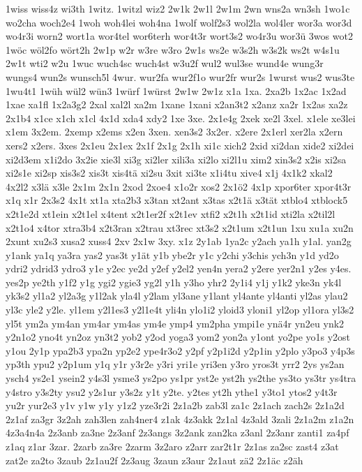 {1wiss
wiss4z
wi3th
1witz.
1witzl
wiz2
2w1k
2w1l
2w1m
2wn
wns2a
wn3sh
1wo1c
wo2cha
woch2e4
1woh
woh4lei
woh4na
1wolf
wolf2s3
wol2la
wol4ler
wor3a
wor3d
wo4r3i
worn2
wort1a
wor4tel
wor6terh
wor4t3r
wort3s2
wo4r3u
wor3ü
3wos
wot2
1wöc
wöl2fo
wört2h
2w1p
w2r
w3re
w3ro
2w1s
ws2e
w3s2h
w3s2k
ws2t
w4s1u
2w1t
wti2
w2u
1wuc
wuch4sc
wuch4st
w3u2f
wul2
wul3se
wund4e
wung3r
wungs4
wun2s
wunsch5l
4wur.
wur2fa
wur2f1o
wur2fr
wur2s
1wurst
wus2
wus3te
1wu4t1
1wüh
wül2
wün3
1würf
1würst
2w1w
2w1z
x1a
1xa.
2xa2b
1x2ac
1x2ad
1xae
xa1fl
1x2a3g2
2xal
xal2l
xa2m
1xane
1xani
x2an3t2
x2anz
xa2r
1x2as
xa2z
2x1b4
x1ce
x1ch
x1cl
4x1d
xda4
xdy2
1xe
3xe.
2x1e4g
2xek
xe2l
3xel.
x1ele
xe3lei
x1em
3x2em.
2xemp
x2ems
x2en
3xen.
xen3s2
3x2er.
x2ere
2x1erl
xer2la
x2ern
xers2
x2ers.
3xes
2x1eu
2x1ex
2x1f
2x1g
2x1h
xi1c
xich2
2xid
xi2dan
xide2
xi2dei
xi2d3em
x1i2do
3x2ie
xie3l
xi3g
xi2ler
xili3a
xi2lo
xi2l1u
xim2
xin3s2
x2is
xi2sa
xi2s1e
xi2sp
xis3s2
xis3t
xis4tä
xi2su
3xit
xi3te
x1i4tu
xive4
x1j
4x1k2
xkal2
4x2l2
x3lä
x3le
2x1m
2x1n
2xod
2xoe4
x1o2r
xos2
2x1ö2
4x1p
xpor6ter
xpor4t3r
x1q
x1r
2x3s2
4x1t
xt1a
xta2b3
x3tan
xt2ant
x3tas
x2t1ä
x3tät
xtblo4
xtblock5
x2t1e2d
xt1ein
x2t1el
x4tent
x2t1er2f
x2t1ev
xtfi2
x2t1h
x2t1id
xti2la
x2til2l
x2t1o4
x4tor
xtra3b4
x2t3ran
x2trau
xt3rec
xt3s2
x2t1um
x2t1un
1xu
xu1a
xu2n
2xunt
xu2s3
xusa2
xuss4
2xv
2x1w
3xy.
x1z
2y1ab
1ya2c
y2ach
ya1h
y1al.
yan2g
y1ank
ya1q
ya3ra
yas2
yas3t
y1ät
y1b
ybe2r
y1c
y2chi
y3chis
ych3n
y1d
yd2o
ydri2
ydrid3
ydro3
y1e
y2ec
ye2d
y2ef
y2el2
yen4n
yera2
y2ere
yer2n1
y2es
y4es.
yes2p
ye2th
y1f2
y1g
ygi2
ygie3
yg2l
y1h
y3ho
yhr2
2y1i4
y1j
y1k2
yke3n
yk4l
yk3s2
yl1a2
yl2a3g
y1l2ak
yla4l
y2lam
yl3ane
y1lant
yl4ante
yl4anti
yl2as
ylau2
yl3c
yle2
y2le.
yl1em
y2l1es3
y2l1e4t
yli4n
ylo1i2
yloid3
yloni1
yl2op
yl1ora
yl3s2
yl5t
ym2a
ym4an
ym4ar
ym4as
ym4e
ymp4
ym2pha
ympi1e
ynä4r
yn2eu
ynk2
y2n1o2
yno4t
yn2oz
yn3t2
yob2
y2od
yoga3
yom2
yon2a
y1ont
yo2pe
yo1s
y2ost
y1ou
2y1p
ypa2b3
ypa2n
yp2e2
ype4r3o2
y2pf
y2p1i2d
y2p1in
y2plo
y3po3
y4p3s
yp3th
ypu2
y2p1um
y1q
y1r
y3r2e
y3ri
yri1e
yri3en
y3ro
yros3t
yrr2
2ys
ys2an
ysch4
ys2e1
ysein2
y4s3l
ysme3
ys2po
ys1pr
yst2e
yst2h
ys2the
ys3to
ys3tr
ys4tra
y4stro
y3s2ty
ysu2
y2s1ur
y3s2z
y1t
y2te.
y2tes
yt2h
ythe1
y3to1
ytos2
y4t3r
yu2r
yur2e3
y1v
y1w
y1y
y1z2
yze3r2i
2z1a2b
zab3l
za1c
2z1ach
zach2s
2z1a2d
2z1af
za3gr
3z2ah
zah3len
zah4ner4
z1ak
4z3akk
2z1al
4z3ald
3zali
2z1a2m
z1a2n
4z3a4n4a
2z3anb
za3ne
2z3anf
2z3angs
3z2ank
zan2ka
z3anl
2z3anr
zanti1
za4pf
z1aq
z1ar
3zar.
2zarb
za3re
2zarm
3z2aro
z2arr
zar2t1r
2z1as
za2sc
zast4
z3at
zat2e
za2to
3zaub
2z1au2f
2z3aug
3zaun
z3aur
2z1aut
zä2
2z1äc
z2äh
}
